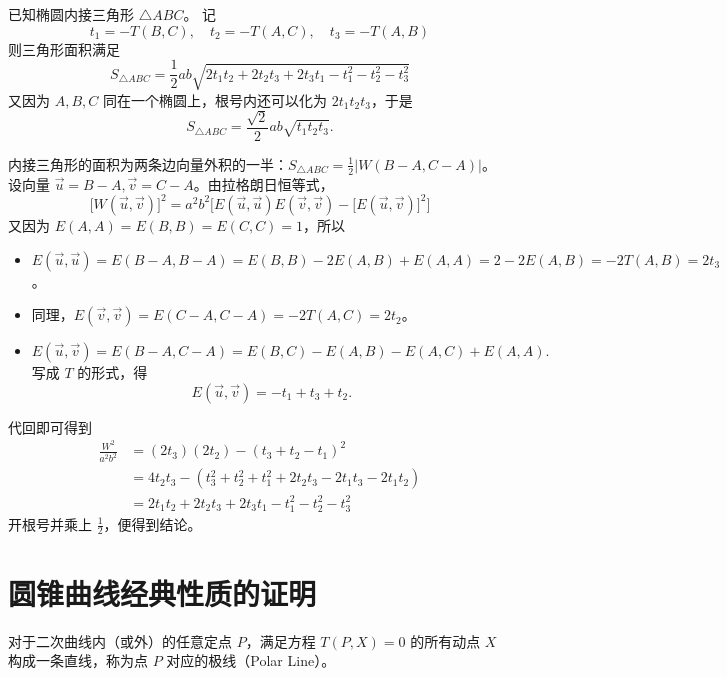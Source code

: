 \begin{conclusion}[内接三角形的海伦型公式]
已知椭圆内接三角形 $\triangle ABC$。
记
$$ t_1 = -T(B,C), \quad t_2 = -T(A,C), \quad t_3 = -T(A,B) $$
则三角形面积满足
$$ S_{\triangle ABC} = \frac{1}{2} a b \sqrt{ 2t_1 t_2 + 2t_2 t_3 + 2t_3 t_1 - t_1^2 - t_2^2 - t_3^2 } $$
又因为 $A,B,C$ 同在一个椭圆上，根号内还可以化为 $2t_1 t_2 t_3$，于是
\[
S_{\triangle ABC} = \frac{\sqrt{2}}{2} ab \sqrt{t_1 t_2 t_3}.
\]
\end{conclusion}
内接三角形的面积为两条边向量外积的一半：$S_{\triangle ABC} = \frac{1}{2} \big| W(B-A, C-A) \big|$。
设向量 $\vec{u} = B-A, \vec{v} = C-A$。由拉格朗日恒等式，
$$ \big[W(\vec{u}, \vec{v})\big]^2 = a^2 b^2 \Big[ E(\vec{u}, \vec{u}) E(\vec{v}, \vec{v}) - \big[E(\vec{u}, \vec{v})\big]^2 \Big] $$
又因为 $E(A,A)=E(B,B)=E(C,C)=1$，所以
\begin{itemize}
\item $E(\vec{u}, \vec{u}) = E(B-A, B-A) = E(B,B) - 2E(A,B) + E(A,A) = 2 - 2E(A,B) = -2T(A,B) = 2t_3$。
\item 同理，$E(\vec{v}, \vec{v}) = E(C-A, C-A) = -2T(A,C) = 2t_2$。
\item
\[
E(\vec{u}, \vec{v}) = E(B-A, C-A) = E(B,C) - E(A,B) - E(A,C) + E(A,A).
\]
写成 $T$ 的形式，得
\[
E(\vec{u}, \vec{v}) = -t_1 + t_3 + t_2.
\]
\end{itemize}
代回即可得到
\begin{align*}
\frac{W^2}{a^2 b^2} &= (2t_3)(2t_2) - (t_3 + t_2 - t_1)^2 \\
&= 4t_2 t_3 - (t_3^2 + t_2^2 + t_1^2 + 2t_2 t_3 - 2t_1 t_3 - 2t_1 t_2) \\
&= 2t_1 t_2 + 2t_2 t_3 + 2t_3 t_1 - t_1^2 - t_2^2 - t_3^2
\end{align*}
开根号并乘上 $\frac{1}{2}$，便得到结论。

\section{圆锥曲线经典性质的证明}

\begin{definition}[极点与极线]
对于二次曲线内（或外）的任意定点 $P$，满足方程 $T(P, X) = 0$ 的所有动点 $X$ 构成一条直线，称为点 $P$ 对应的极线（Polar Line）。
\end{definition}

